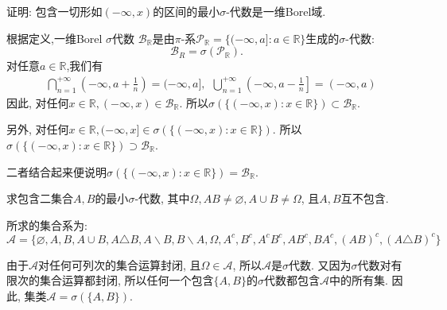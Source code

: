 \begin{yyEx}
	证明: 包含一切形如$(-\infty,x)$的区间的最小$\sigma$-代数是一维Borel域.

\end{yyEx}
	\begin{yyProof}
	根据定义,一维Borel $\sigma$代数 $\mathscr{B}_\mathbb{R}$是由$\pi$-系$\mathscr{P}_\mathbb{R} = \{(-\infty,a]:a\in\mathbb{R}\}$生成的$\sigma$-代数:
	\begin{equation}
	\mathscr{B}_R = \sigma(\mathscr{P}_\mathbb{R}).
	\end{equation}
	对任意$a\in\mathbb{R}$,我们有
	\begin{align}
	&\bigcap_{n=1}^{+\infty}\left(-\infty,a+\frac{1}{n}\right) = (-\infty,a],~~\bigcup_{n=1}^{+\infty}\left(-\infty,a-\frac{1}{n}\right] = (-\infty,a)
	\end{align}
	因此, 对任何$x\in\mathbb{R},(-\infty,x)\in\mathscr{B}_{\mathbb{R}}$.
	所以$\sigma(\{ (-\infty,x):x\in\mathbb{R} \})\subset \mathscr{B}_{\mathbb{R}}$.
	
	另外, 对任何$x\in\mathbb{R},(-\infty,x]\in\sigma(\{ (-\infty,x):x\in\mathbb{R} \})$.
	所以$\sigma(\{ (-\infty,x):x\in\mathbb{R} \})\supset \mathscr{B}_{\mathbb{R}}$.
	
	二者结合起来便说明$\sigma(\{ (-\infty,x):x\in\mathbb{R} \})= \mathscr{B}_{\mathbb{R}}$.
\end{yyProof}

\begin{yyEx}
	求包含二集合$A,B$的最小$\sigma$-代数, 其中$\Omega,AB\neq\varnothing, A\cup B\neq\Omega$, 且$A,B$互不包含.
\end{yyEx}
\begin{yySolution}
	所求的集合系为:\begin{equation}
	\mathscr{A} = \{\varnothing,A,B,A\cup B,A\triangle B,A\backslash B, B\backslash A,\Omega,A^c,B^c,A^cB^c,AB^c,BA^c,(AB)^c,(A\triangle B)^c \}
	\end{equation}
\end{yySolution}
\begin{yyProof}
	由于$\mathscr{A}$对任何可列次的集合运算封闭, 且$\Omega\in\mathscr{A}$, 所以$\mathscr{A}$是$\sigma$代数. 又因为$\sigma$代数对有限次的集合运算都封闭, 所以任何一个包含$\{A,B\}$的$\sigma$代数都包含$\mathscr{A}$中的所有集. 因此, 集类$\mathscr{A} = \sigma(\{A,B\})$.
\end{yyProof}



